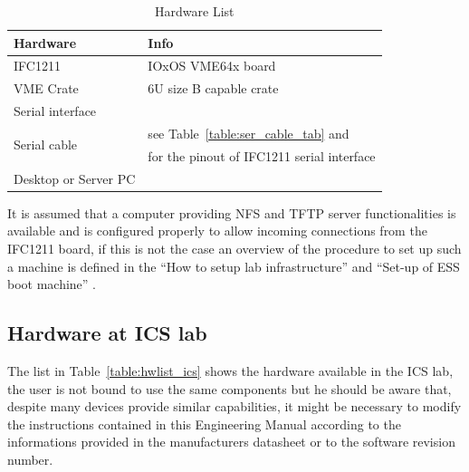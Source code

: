 \documentclass[11pt
  , a4paper
  , article
  , oneside
  , showtrims
]{memoir}
\begin{document}
\begin{table}[!hb]
	\centering
	\begin{tabular}{l|l}
		\toprule
		\bfseries{Hardware}       & \bfseries{Info}                  \\\midrule
		IFC1211                   & IOxOS VME64x board               \\\midrule
		VME Crate                 & 6U size B capable crate          \\\midrule
		Serial interface          &                                  \\\midrule
		\multicolumn{1}{l|}{\multirow{2}{*}{Serial cable}} & see Table~\ref{table:ser_cable_tab} and \cite{IFC1211_HW_TUG}\\
		                          & for the pinout of IFC1211 serial interface   \\\midrule
		Desktop or Server PC      &                                  \\\bottomrule
	\end{tabular}
	\caption[]{Hardware List}
	\label{table:hwlist}
\end{table}

It is assumed that a computer providing NFS and TFTP server functionalities is available and is configured properly to allow incoming connections from the IFC1211 board, if this is not the case an overview of the procedure to set up such a machine is defined in the ``How to setup lab infrastructure''\cite{SULI} and ``Set-up of ESS boot machine'' \cite{SETUP_LAB_INFRASTRUCTURE}.

\subsection{Hardware at ICS lab}
The list in Table~\ref{table:hwlist_ics} shows the hardware available in the ICS lab, the user is not bound to use the same components but he should be aware that, despite many devices provide similar capabilities, it might be necessary to modify the instructions contained in this Engineering Manual according to the informations provided in the manufacturers datasheet or to the software revision number.
\end{document}
